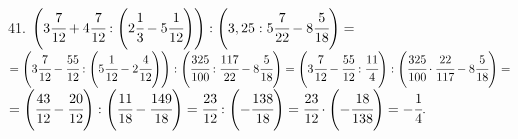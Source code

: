 41. $\left(3\cfrac{7}{12}+4\cfrac{7}{12}: \left(2\cfrac{1}{3}-5\cfrac{1}{12}\right)\right):
\left(3,25:5\cfrac{7}{22}-8\cfrac{5}{18}\right)=$\\$=\left(3\cfrac{7}{12}-\cfrac{55}{12}: \left(5\cfrac{1}{12}-2\cfrac{4}{12}\right)\right):
\left(\cfrac{325}{100}:\cfrac{117}{22}-8\cfrac{5}{18}\right)=\left(3\cfrac{7}{12}-\cfrac{55}{12}:\cfrac{11}{4}\right):
\left(\cfrac{325}{100}\cdot\cfrac{22}{117}-8\cfrac{5}{18}\right)=$\\$=\left(\cfrac{43}{1 2}-\cfrac{20}{12}\right):
\left(\cfrac{11}{18}-\cfrac{149}{18}\right)=\cfrac{23}{12}:
\left(-\cfrac{138}{18}\right)=\cfrac{23}{12}\cdot\left(-\cfrac{18}{138}\right)=-\cfrac{1}{4}.$\\
